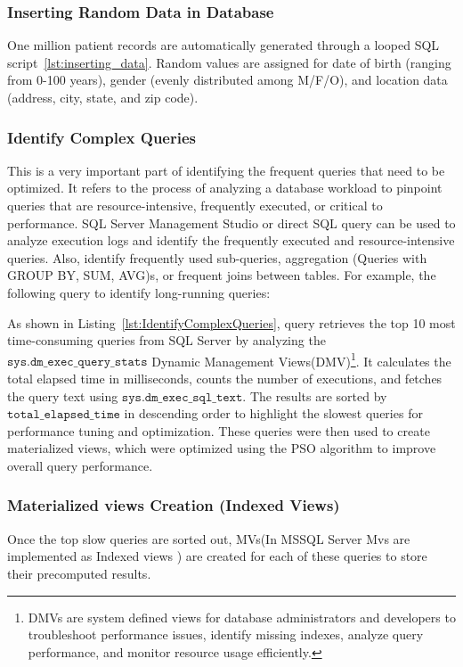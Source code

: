 
\subsubsection{Inserting Random Data in Database}
One million patient records are automatically generated through a looped SQL script~\ref{lst:inserting_data}. Random values are assigned for date of birth (ranging from 0-100 years), gender (evenly distributed among M/F/O), and location data (address, city, state, and zip code).\vspace{.4cm}

 

\subsubsection{Identify Complex Queries} This is a very important part of identifying the frequent queries that need to be optimized. It refers to the process of analyzing a database workload to pinpoint queries that are resource-intensive, frequently executed, or critical to performance. SQL Server Management Studio or direct SQL query can be used to analyze execution logs and identify the frequently executed and resource-intensive queries. Also, identify frequently used sub-queries, aggregation (Queries with GROUP BY, SUM, AVG)s, or frequent joins between tables. For example, the following query to identify long-running queries: \vspace{.4cm}



As shown in Listing~\ref{lst:IdentifyComplexQueries}, query retrieves the top 10 most time-consuming queries from SQL Server by analyzing the \(\texttt{sys.dm\_exec\_query\_stats}\) Dynamic Management Views(DMV)\footnote{DMVs are system defined views for database administrators and developers to troubleshoot performance issues, identify missing indexes, analyze query performance, and monitor resource usage efficiently.}. It calculates the total elapsed time in milliseconds, counts the number of executions, and fetches the query text using \(\texttt{sys.dm\_exec\_sql\_text}\). The results are sorted by \(\texttt{total\_elapsed\_time}\) in descending order to highlight the slowest queries for performance tuning and optimization. These queries were then used to create materialized views, which were optimized using the PSO algorithm to improve overall query performance.

\subsubsection{ Materialized views Creation (Indexed Views)}\label{Query_decomposition} Once the top slow queries are sorted out, MVs(In MSSQL Server Mvs are implemented as Indexed views ) are created for each of these queries to store their precomputed results.\vspace{.4cm}

